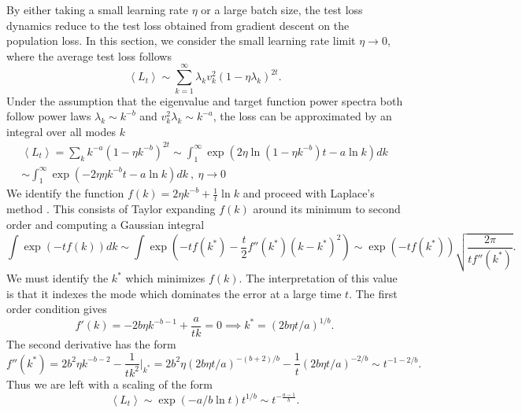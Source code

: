 \documentclass{article} %
\begin{document}
By either taking a small learning rate $\eta$ or a large batch size, the test loss dynamics reduce to the test loss obtained from gradient descent on the population loss. In this section, we consider the small learning rate limit $\eta \to 0$, where the average test loss follows 
\begin{equation}
    \left< L_t \right> \sim \sum_{k=1}^\infty \lambda_k v_k^2 (1-\eta\lambda_k)^{2t}.
\end{equation}
%
Under the assumption that the eigenvalue and target function power spectra both follow power laws $\lambda_k \sim k^{-b}$ and $v_k^2 \lambda_k \sim k^{-a}$, the loss can be approximated by an integral over all modes $k$
\begin{align}
    \left< L_t \right> = \sum_{k} k^{-a} (1-\eta k^{-b})^{2t} \sim \int_1^\infty \exp\left(  2\eta \ln(1- \eta k^{-b}) t - a \ln k \right) dk 
    \\
    \sim \int_1^\infty \exp\left( - 2\eta  \eta k^{-b} t - a \ln k \right) dk  \ , \ \eta \to 0
\end{align}
%
We identify the function $f(k) = 2\eta k^{-b} + \frac{1}{t} \ln k$ and proceed with Laplace's method \citep{bender}. This consists of Taylor expanding $f(k)$ around its minimum to second order and computing a Gaussian integral
\begin{equation}
    \int \exp(- t f(k) ) dk \sim \int \exp\left(-t f(k^*) - \frac{t}{2} f''(k^*) (k-k^*)^2 \right) \sim \exp(-t f(k^*) ) \sqrt{\frac{2\pi}{t f''(k^*)}}.
\end{equation}
%
We must identify the $k^*$ which minimizes $f(k)$. The interpretation of this value is that it indexes the mode which dominates the error at a large time $t$. The first order condition gives 
\begin{equation}
    f'(k) = -2b\eta k^{-b-1} + \frac{a}{t k} = 0 \implies k^* = \left(2 b \eta t / a  \right)^{1/b}. 
\end{equation}
%
The second derivative has the form
\begin{equation}
    f''(k^*) = 2 b^2 \eta k^{-b-2} - \frac{1}{tk^2} |_{k^*} = 2 b^2 \eta \left( 2 b \eta t / a \right)^{-(b+2)/b} - \frac{1}{t} \left( 2b \eta t / a \right)^{-2/b} \sim t^{-1 - 2/b}.
\end{equation}
%
Thus we are left with a scaling of the form
\begin{equation}
    \left< L_t  \right> \sim \exp(-a/b\ln t) t^{1/b} \sim t^{-\frac{a-1}{b}}.
\end{equation}
\end{document}
